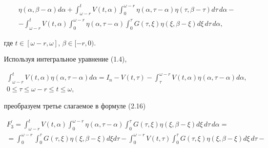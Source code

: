 \begin{pf}
\begin{multline}
\eta(\alpha, \beta- \alpha) d \alpha+


\int_{\omega-r}^{t}V(t, \alpha)


\int_{0}^{\omega-r} \eta(\alpha, \tau- \alpha) \eta(\tau, \beta- \tau)


d \tau\, d \alpha- \\


%


- \int_{\omega-r}^{t}V(t, \alpha) \int_{0}^{\omega-r}


\eta(\alpha, \tau- \alpha) \int_{0}^{\tau}G(\tau, \xi)


\eta(\xi, \beta- \xi) d \xi\,d \tau\, d \alpha,


\end{multline}


где $ t \in[\omega-r, \omega]$, $\beta \in[-r,0)$.


Используя интегральное уравнение (1.4),


\begin{gather*}


\int_{\omega-r}^{t}V(t, \alpha) \eta(\alpha, \tau- \alpha) d


\alpha


=I_{n} -V(t, \tau) - \int_{\tau}^{\omega-r}V(t, \alpha) \eta(\alpha,


\tau- \alpha) d \alpha, \\


%


0 \leq \tau \leq \omega-r \leq t \leq \omega,


\end{gather*}


преобразуем третье слагаемое в формуле (2.16)


\begin{multline}


F_{3}^{\prime} =


\int_{\omega-r}^{t}V(t, \alpha) \int_{0}^{\omega-r}


\eta(\alpha, \tau- \alpha) \int_{0}^{\tau}G(\tau, \xi)


\eta(\xi, \beta- \xi) d \xi\, d \tau\, d \alpha= \\


%


= \int_{0}^{\omega-r} \int_{0}^{\tau}G(\tau, \xi)


 \eta(\xi, \beta- \xi) d \xi d \tau- \int_{0}^{\omega-r}V(t, \tau)


 \int_{0}^{\tau}G(\tau, \xi) \eta(\xi, \beta- \xi) d \xi\, d \tau-  \\



\end{multline}
\end{pf}
